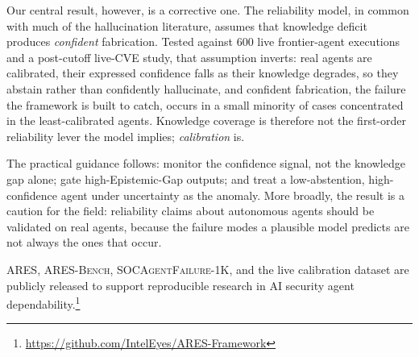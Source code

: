 \documentclass[journal,compsoc]{IEEEtran}
\newcommand{\ARES}{\textsc{ARES}}
\newcommand{\ARESBench}{\textsc{ARES-Bench}}
\newcommand{\SAFK}{\textsc{SOCAgentFailure-1K}}
\begin{document}
Our central result, however, is a corrective one. The reliability
model, in common with much of the hallucination literature, assumes
that knowledge deficit produces \textit{confident} fabrication. Tested
against 600 live frontier-agent executions and a post-cutoff live-CVE
study, that assumption inverts: real agents are calibrated, their
expressed confidence falls as their knowledge degrades, so they abstain
rather than confidently hallucinate, and confident fabrication, the
failure the framework is built to catch, occurs in a small minority of
cases concentrated in the least-calibrated agents. Knowledge coverage
is therefore not the first-order reliability lever the model implies;
\textit{calibration} is.

The practical guidance follows: monitor the confidence signal, not the
knowledge gap alone; gate high-Epistemic-Gap outputs; and treat a
low-abstention, high-confidence agent under uncertainty as the anomaly.
More broadly, the result is a caution for the field: reliability claims
about autonomous agents should be validated on real agents, because the
failure modes a plausible model predicts are not always the ones that
occur.

\ARES{}, \ARESBench{}, \SAFK{}, and the live calibration dataset are
publicly released to support reproducible research in AI security agent
dependability.\footnote{\url{https://github.com/IntelEyes/ARES-Framework}}
\end{document}
